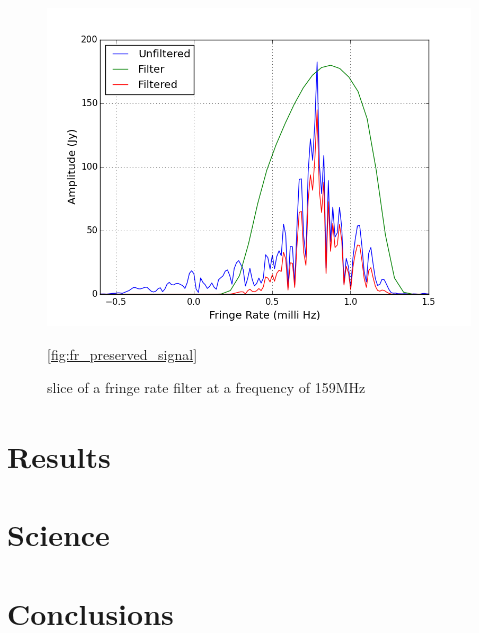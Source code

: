 \documentclass[twocolumn,numberedappendix]{emulateapj}
\begin{document}
\begin{figure}
\centering
\includegraphics[width=2\columnwidth]{plots/fr_preserved_signal.png}
\caption{slice of a fringe rate filter at a frequency of 159MHz}
\ref{fig:fr_preserved_signal}
\end{figure}





% 


\section{Results}

\section{Science}

\section{Conclusions}


\nocite{*}


\end{document}
